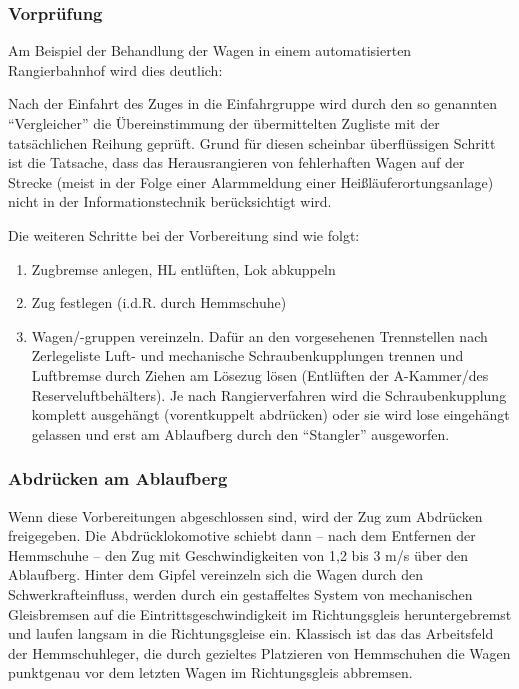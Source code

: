 \subsubsection{Vorprüfung}\label{sec:Vorpruefung}
Am Beispiel der Behandlung der Wagen in einem automatisierten \gls{Rangierbahnhof} wird dies deutlich:\par
Nach der Einfahrt des Zuges in die Einfahrgruppe wird durch den so genannten "`Vergleicher"' die Übereinstimmung der übermittelten Zugliste mit der tatsächlichen Reihung geprüft. Grund für diesen scheinbar überflüssigen Schritt ist die Tatsache, dass das Herausrangieren von fehlerhaften Wagen auf der Strecke (meist in der Folge einer Alarmmeldung einer Heißläuferortungsanlage) nicht in der Informationstechnik berücksichtigt wird.\par
Die weiteren Schritte bei der Vorbereitung sind wie folgt:
\begin{enumerate}
    \item Zugbremse anlegen, \acrshort{HL} entlüften, Lok abkuppeln
    \item Zug festlegen (i.d.R. durch \gls{Hemmschuh}e)
    \item Wagen/-gruppen vereinzeln. Dafür an den vorgesehenen Trennstellen nach Zerlegeliste Luft- und mechanische Schraubenkupplungen trennen und Luftbremse durch Ziehen am Lösezug lösen (Entlüften der A-Kammer/des Reserveluftbehälters). Je nach Rangierverfahren wird die Schraubenkupplung komplett ausgehängt (vorentkuppelt abdrücken) oder sie wird lose eingehängt gelassen und erst am \gls{Ablaufberg} durch den "`Stangler"' ausgeworfen.
\end{enumerate}
\subsubsection{Abdrücken am Ablaufberg}\label{sec:Abdruecken}
Wenn diese Vorbereitungen abgeschlossen sind, wird der Zug zum Abdrücken freigegeben. Die Abdrücklokomotive schiebt dann -- nach dem Entfernen der Hemmschuhe -- den Zug mit Geschwindigkeiten von 1,2 bis 3 m/s %
über den \gls{Ablaufberg}. Hinter dem Gipfel vereinzeln sich die Wagen durch den Schwerkrafteinfluss, werden durch ein gestaffeltes System von mechanischen Gleisbremsen auf die Eintrittsgeschwindigkeit im Richtungsgleis heruntergebremst und laufen langsam in die Richtungsgleise ein.  Klassisch ist das das Arbeitsfeld der Hemmschuhleger, die durch gezieltes Platzieren von Hemmschuhen die Wagen punktgenau vor dem letzten Wagen im Richtungsgleis abbremsen.
